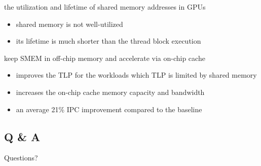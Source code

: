 \documentclass[
    fontset=fandol,
    xcolor=svgnames %
]{ctexbeamer}
\begin{document}
\begin{frame}

    \begin{block}{the utilization and lifetime of shared memory addresses in GPUs}
        \begin{itemize}
            \item shared memory is not well-utilized \item its lifetime is much shorter than the thread block execution
        \end{itemize}
    \end{block}

    \begin{block}{keep SMEM in off-chip memory and accelerate via on-chip cache}
        \begin{itemize}
            \item improves the TLP for the workloads which TLP is limited by shared memory
            \item increases the on-chip cache memory capacity and bandwidth
            \item an average 21\% IPC improvement compared to the baseline
        \end{itemize}
    \end{block}

\end{frame}

\subsection{Q \& A}

\begin{frame}

    \begin{block}{Questions?}
        ~\\
        ~\\
        \\
        ~\\
        ~\\
        ~\\
        ~\\
    \end{block}

\end{frame}
\end{document}
